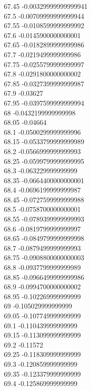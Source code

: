 {67.45	-0.00329999999999941\\
67.5	-0.00709999999999944\\
67.55	-0.0108599999999992\\
67.6	-0.0145900000000001\\
67.65	-0.0182899999999986\\
67.7	-0.0219499999999986\\
67.75	-0.0255799999999997\\
67.8	-0.0291800000000002\\
67.85	-0.0327399999999987\\
67.9	-0.03627\\
67.95	-0.0397599999999994\\
68	-0.0432199999999998\\
68.05	-0.04664\\
68.1	-0.0500299999999996\\
68.15	-0.0533799999999989\\
68.2	-0.0566999999999993\\
68.25	-0.0599799999999995\\
68.3	-0.063229999999999\\
68.35	-0.0664400000000001\\
68.4	-0.0696199999999987\\
68.45	-0.0727599999999988\\
68.5	-0.0758700000000001\\
68.55	-0.0789399999999993\\
68.6	-0.0819799999999997\\
68.65	-0.0849799999999998\\
68.7	-0.0879499999999993\\
68.75	-0.0908800000000003\\
68.8	-0.0937799999999989\\
68.85	-0.0966499999999986\\
68.9	-0.0994700000000002\\
68.95	-0.102269999999999\\
69	-0.105029999999999\\
69.05	-0.107749999999999\\
69.1	-0.110439999999999\\
69.15	-0.113099999999999\\
69.2	-0.11572\\
69.25	-0.118309999999999\\
69.3	-0.120859999999999\\
69.35	-0.123379999999999\\
69.4	-0.125869999999999\\
}
